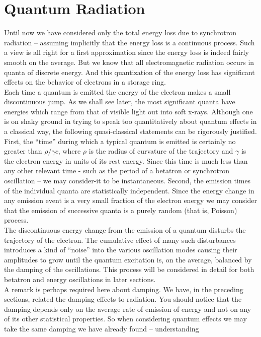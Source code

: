 \section{Quantum Radiation} \label{sec:5.1}

Until now we have considered only the total energy loss due to synchrotron radiation -- assuming implicitly that the energy loss is a continuous process. Such a view is all right for a first
 approximation since the energy loss is indeed fairly smooth on the average. But we know that all electromagnetic radiation occurs in quanta of discrete energy. And this quantization of the energy loss has significant effects on the behavior of electrons in a storage ring.\\
Each time a quantum is emitted the energy of the electron makes a small discontinuous jump. As we shall see later, the most significant quanta have energies which range from that of visible light out into soft x-rays. Although one is on shaky ground in trying to speak too quantitatively about quantum effects in a classical way, the following quasi-classical statements can be rigorously
 justified. First, the ``time'' during which a typical quantum is emitted is certainly no greater
than $\rho/\gamma c$, where $\rho$ is the radius of curvature of the trajectory and $\gamma$ is the electron energy in units of its rest energy. Since this time is much less than any other
relevant time - such as the period of a betatron or synchrotron oscillation -- we may consider-it
 to be instantaneous. Second, the emission times of the individual quanta are statistically
 independent. Since the energy change in any emission event is a very small fraction of the electron energy we may consider that the emission of successive quanta is a purely random (that is, Poisson) process.\\
The discontinuous energy change from the emission of a quantum disturbs the trajectory of the electron. The cumulative effect of many such disturbances introduces a kind of ``noise'' into the various oscillation modes causing their amplitudes to grow until the quantum excitation is, on the average, balanced by the damping of the oscillations. This process will be considered in detail for both betatron and energy oscillations in later sections.\\
A remark is perhaps required here about damping. We have, in the preceding sections, related the damping effects to radiation. You should notice that the damping depends only on the average rate of emission of energy and not on any of its other statistical properties. So when considering quantum effects we may take the same damping we have already found -- understanding
